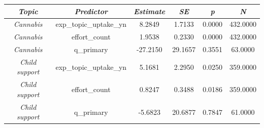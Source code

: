 \begin{tabular}{c c c c c c}
      \hline
      \textit{Topic} & \textit{Predictor} & \textit{Estimate} & \textit{SE} & \textit{p} & \textit{N} \\
      \hline
      \textit{Cannabis} & exp\_topic\_uptake\_yn & 8.2849 & 1.7133 & 0.0000 & 432.0000 \\
      \textit{Cannabis} & effort\_count & 1.9538 & 0.2330 & 0.0000 & 432.0000 \\
      \textit{Cannabis} & q\_primary & -27.2150 & 29.1657 & 0.3551 & 63.0000 \\
      \textit{Child support} & exp\_topic\_uptake\_yn & 5.1681 & 2.2950 & 0.0250 & 359.0000 \\
      \textit{Child support} & effort\_count & 0.8247 & 0.3488 & 0.0186 & 359.0000 \\
      \textit{Child support} & q\_primary & -5.6823 & 20.6877 & 0.7847 & 61.0000 \\
      \hline
    \end{tabular}